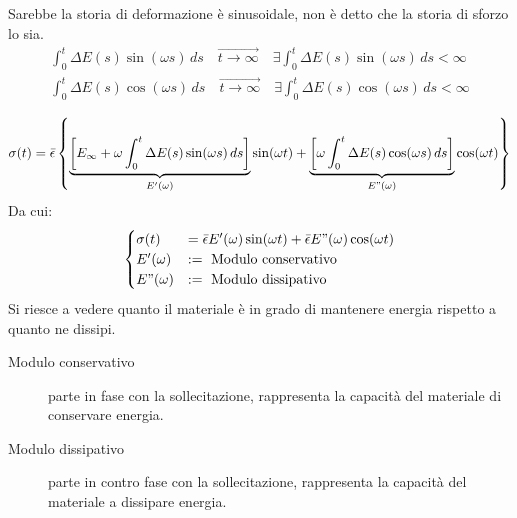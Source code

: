 Sarebbe la storia di deformazione è sinusoidale, non è detto che la storia di sforzo lo sia.
\begin{equation}
\begin{split}
\int_0^t{\Delta E(s)\sin(\omega s)\,ds} \quad \overrightarrow{t \rightarrow \infty} \quad \exists \int_0^t{\Delta E(s)\sin(\omega s)\,ds} < \infty\\
\int_0^t{\Delta E(s)\cos(\omega s)\,ds} \quad \overrightarrow{t \rightarrow \infty} \quad \exists \int_0^t{\Delta E(s)\cos(\omega s)\,ds} < \infty\\
\end{split}
\end{equation}
\begin{equation}
\sigma(t) = \bar{\epsilon}\left\lbrace\underbrace{\left[E_{\infty} + \omega\int_0^t{\Delta E(s)\sin(\omega s)\,ds}\right]}_{E'(\omega)}\sin(\omega t) + \underbrace{\left[\omega\int_0^t{\Delta E(s)\cos(\omega s)\,ds}\right]}_{E"(\omega)}\cos(\omega t)\right\rbrace
\end{equation}
Da cui:
\begin{equation}
\begin{cases}
\sigma(t) &= \bar{\epsilon} E'(\omega)\sin(\omega t) + \bar{\epsilon} E"(\omega)\cos(\omega t)\\
E'(\omega) &:=\textup{ Modulo conservativo}\\
E"(\omega) &:=\textup{ Modulo dissipativo}
\end{cases}
\end{equation}
Si riesce a vedere quanto il materiale è in grado di mantenere energia rispetto a quanto ne dissipi.

\begin{description}
\item[Modulo conservativo] parte in fase con la sollecitazione, rappresenta la capacità del materiale di conservare energia.
\item[Modulo dissipativo] parte in contro fase con la sollecitazione, rappresenta la capacità del materiale a dissipare energia. 
\end{description}

